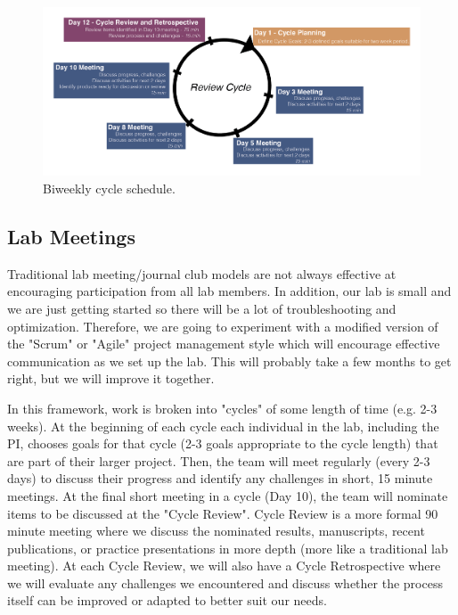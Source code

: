 \documentclass[10pt, letterpaper, twocolumn]{article} %
\begin{document}
\begin{figure}
  \includegraphics[width=\textwidth]{Core_Competencies-02.png}
  \caption{Biweekly cycle schedule.}
\end{figure}
\subsection{Lab Meetings}
Traditional lab meeting/journal club models are not always effective at encouraging participation from all lab members.  In addition, our lab is small and we are just getting started so there will be a lot of troubleshooting and optimization. Therefore, we are going to experiment with a modified version of the "Scrum" or "Agile" project management style \citep{May2019-kp} which will encourage effective communication as we set up the lab. This will probably take a few months to get right, but we will improve it together.

In this framework, work is broken into "cycles" of some length of time (e.g. 2-3 weeks). At the beginning of each cycle each individual in the lab, including the PI, chooses goals for that cycle (2-3 goals appropriate to the cycle length) that are part of their larger project. Then, the team will meet regularly (every 2-3 days) to discuss their progress and identify any challenges in short, 15 minute meetings. At the final short meeting in a cycle (Day 10), the team will nominate items to be discussed at the "Cycle Review". Cycle Review is a more formal 90 minute meeting where we discuss the nominated results, manuscripts, recent publications, or practice presentations in more depth (more like a traditional lab meeting). At each Cycle Review, we will also have a Cycle Retrospective where we will evaluate any challenges we encountered and discuss whether the process itself can be improved or adapted to better suit our needs.
\end{document}
